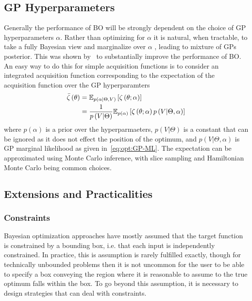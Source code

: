 \subsection{GP Hyperparameters}
\label{sec:opt:BO:hyp}

Generally the performance of BO will be strongly dependent on the choice of GP
 hyperparameters $\alpha$.  Rather than optimizing for $\alpha$ it is natural, 
 when tractable, to take a fully Bayesian view and marginalize
 over $\alpha$ \cite{osborne2009gaussian, snoek2012practical}, leading to
 mixture of GPs posterior.  This was shown
 by~\cite{snoek2012practical} to substantially improve the performance of BO.
 An easy way to do this for simple acquisition functions is to consider an
 integrated acquisition function corresponding to the expectation of the acquisition
 function over the GP hyperparamters~\citep{snoek2012practical}
\begin{align}
\label{eq:opt:intAcq}
\bar{\zeta}\left(\theta \right) &= \mathbb{E}_{p\left(\alpha | \Theta, V\right)}
\left[  \zeta\left(\theta  ; \alpha\right)  \right] \\
&= \frac{1}{p\left(V | \Theta \right)} \mathbb{E}_{p\left(\alpha \right)}
\left[  \zeta\left(\theta  ; \alpha\right)  p\left(V | \Theta, \alpha\right)\right]
\end{align}
where $p(\alpha)$ is a prior over the hyperparmaeters, $p\left(V | \Theta \right)$ is
a constant that can be ignored as it does not effect the position of the optimum, and
$p\left(V | \Theta, \alpha\right)$ is GP marginal likelihood as given in~\eqref{eq:opt:GP-ML}.
The expectation can be approximated using Monte Carlo inference, with slice sampling
\citep{neal2003slice,murray2010slice} and Hamiltonian Monte Carlo \citep{duane1987hybrid,hensman2015mcmc}
being common choices.

\subsection{Extensions and Practicalities}
\label{sec:opt:BO:exten}

\subsubsection{Constraints}
\label{sec:opt:BO:exten:constraints}

Bayesian optimization approaches have mostly assumed that the target function
is constrained by a bounding box, i.e. that each input is independently constrained.
In practice, this is assumption is rarely fulfilled exactly, though for technically unbounded 
problems then it is not uncommon
for the user to be able to specify a box conveying the region where it is reasonable to
assume to the true optimum falls within the box.  To go beyond this assumption, it is
necessary to design strategies that can deal with constraints.
